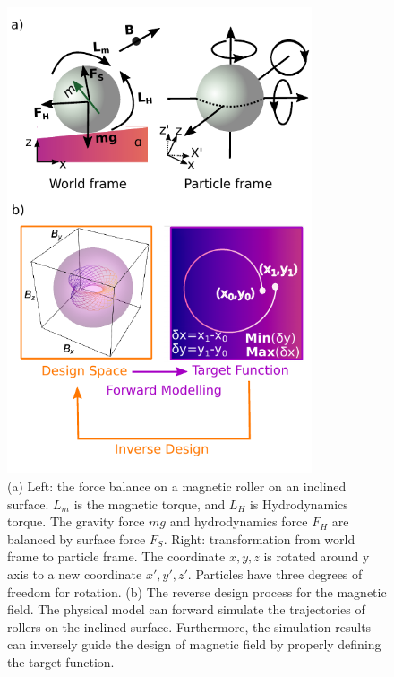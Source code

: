 \begin{figure}[p]
\centering
\includegraphics[width=9cm]{figures/5_2.pdf}
\caption{ (a) Left: the force balance on a magnetic roller on an inclined surface. $L_m$ is the magnetic torque, and $L_H$ is Hydrodynamics torque. The gravity force $mg$ and hydrodynamics force $F_H$ are balanced by surface force $F_S$.   Right: transformation from world frame to particle frame. The coordinate $x,y,z$ is rotated around y axis to a new coordinate $x',y',z'$. Particles have three degrees of freedom for rotation. (b) The reverse design process for the magnetic field. The physical model can forward simulate the trajectories of rollers on the inclined surface. Furthermore, the simulation results can inversely guide the design of magnetic field by properly defining the target function.}
\label{fig:5.2}
\end{figure}
